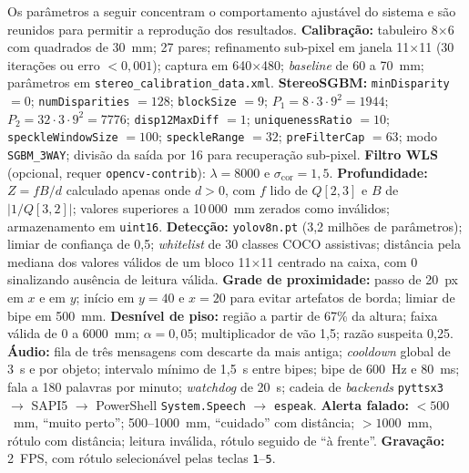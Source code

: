 \documentclass[12pt]{article}
\begin{document}
\noindent
Os parâmetros a seguir concentram o comportamento ajustável do sistema e são
reunidos para permitir a reprodução dos resultados.
\textbf{Calibração:} tabuleiro 8$\times$6 com quadrados de 30~mm; 27 pares;
refinamento sub-pixel em janela 11$\times$11 (30 iterações ou erro $< 0{,}001$);
captura em 640$\times$480; \textit{baseline} de 60 a 70~mm; parâmetros em
\texttt{stereo\_calibration\_data.xml}.
\textbf{StereoSGBM:} \texttt{minDisparity} $= 0$;
\texttt{numDisparities} $= 128$; \texttt{blockSize} $= 9$;
$P_1 = 8 \cdot 3 \cdot 9^2 = 1944$; $P_2 = 32 \cdot 3 \cdot 9^2 = 7776$;
\texttt{disp12MaxDiff} $= 1$; \texttt{uniquenessRatio} $= 10$;
\texttt{speckleWindowSize} $= 100$; \texttt{speckleRange} $= 32$;
\texttt{preFilterCap} $= 63$; modo \texttt{SGBM\_3WAY}; divisão da saída por
16 para recuperação sub-pixel.
\textbf{Filtro WLS} (opcional, requer \texttt{opencv-contrib}):
$\lambda = 8000$ e $\sigma_{\text{cor}} = 1{,}5$.
\textbf{Profundidade:} $Z = fB/d$ calculado apenas onde $d > 0$, com $f$ lido
de $Q[2,3]$ e $B$ de $|1/Q[3,2]|$; valores superiores a 10\,000~mm zerados
como inválidos; armazenamento em \texttt{uint16}.
\textbf{Detecção:} \texttt{yolov8n.pt} (3,2 milhões de parâmetros); limiar de
confiança de 0,5; \textit{whitelist} de 30 classes COCO assistivas; distância
pela mediana dos valores válidos de um bloco 11$\times$11 centrado na caixa,
com 0 sinalizando ausência de leitura válida.
\textbf{Grade de proximidade:} passo de 20~px em $x$ e em $y$; início em
$y = 40$ e $x = 20$ para evitar artefatos de borda; limiar de bipe em 500~mm.
\textbf{Desnível de piso:} região a partir de 67\% da altura; faixa válida de
0 a 6000~mm; $\alpha = 0{,}05$; multiplicador de vão 1,5; razão suspeita
0,25.
\textbf{Áudio:} fila de três mensagens com descarte da mais antiga;
\textit{cooldown} global de 3~s e por objeto; intervalo mínimo de 1,5~s entre
bipes; bipe de 600~Hz e 80~ms; fala a 180 palavras por minuto;
\textit{watchdog} de 20~s; cadeia de \textit{backends}
\texttt{pyttsx3} $\rightarrow$ SAPI5 $\rightarrow$ PowerShell
\texttt{System.Speech} $\rightarrow$ \texttt{espeak}.
\textbf{Alerta falado:} $<500$~mm, ``muito perto''; 500--1000~mm,
``cuidado'' com distância; $>1000$~mm, rótulo com distância; leitura
inválida, rótulo seguido de ``à frente''. \textbf{Gravação:} 2~FPS, com
rótulo selecionável pelas teclas \texttt{1}--\texttt{5}.
\end{document}
